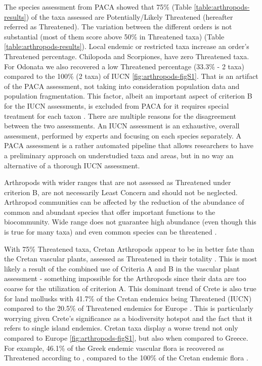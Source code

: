 The species assessment from PACA showed that 75\% (Table \ref{table:arthropods-results}) of the
taxa assessed are Potentially/Likely Threatened (hereafter referred as Threatened).
The variation between the different orders is not substantial (most of them
score above 50\% in Threatened taxa) (Table \ref{table:arthropods-results}). Local endemic or restricted taxa
increase an order’s Threatened percentage. Chilopoda and Scorpiones, have zero
Threatened taxa. For Odonata we also recovered a low Threatened percentage
(33.3\% - 2 taxa) compared to the 100\% (2 taxa) of IUCN
\ref{fig:arthropods-figS1}. That is an artifact of the PACA
assessment, not taking into consideration population data and population
fragmentation. This factor, albeit an important aspect of criterion B for the
IUCN assessments, is excluded from PACA for it requires special treatment for
each taxon \parencite{dauby2017conr:}. There are multiple reasons for the disagreement
between the two assessments. An IUCN assessment is an exhaustive, overall
assessment, performed by experts and focusing on each species separately.
A PACA assessment is a rather automated pipeline that allows researchers to
have a preliminary approach on understudied taxa and areas, but in no way an
alternative of a thorough IUCN assessment.

Arthropods with wider ranges that are not assessed as Threatened under
criterion B, are not necessarily Least Concern and should not be neglected.
Arthropod communities can be affected by the reduction of the abundance of
common and abundant species that offer important functions to the biocommunity.
Wide range does not guarantee high abundance (even though this is true for many
taxa) and even common species can be threatened \parencite{habel2018vanishing,klink2023disproportionate}.

With 75\% Threatened taxa, Cretan Arthropods appear to be in better fate than
the Cretan vascular plants, assessed as Threatened in their totality
\parencite{kougioumoutzis2020plant}. This is most likely a result of the combined use
of Criteria A and B in the vascular plant assessment \parencite{kougioumoutzis2020plant} -
something impossible for the Arthropods since their data are too coarse for the
utilization of criterion A. This dominant trend of Crete is also true for land
mollusks with 41.7\% of the Cretan endemics being Threatened (IUCN) compared to
the 20.5\% of Threatened endemics for Europe \parencite{neubert2019}. This is
particularly worrying given Crete’s significance as a biodiversity
hotspot \parencite{medail2017the-specific,myers2000biodiversity} and the fact that it refers to single
island endemics. Cretan taxa display a worse trend not only compared to Europe \ref{fig:arthropods-figS1},
but also when compared to Greece. For example, 46.1\% of the Greek endemic
vascular flora is recovered as Threatened according to \textcite{kougioumoutzis2021extinction},
compared to the 100\% of the Cretan endemic flora \parencite{kougioumoutzis2020plant}. 
    
